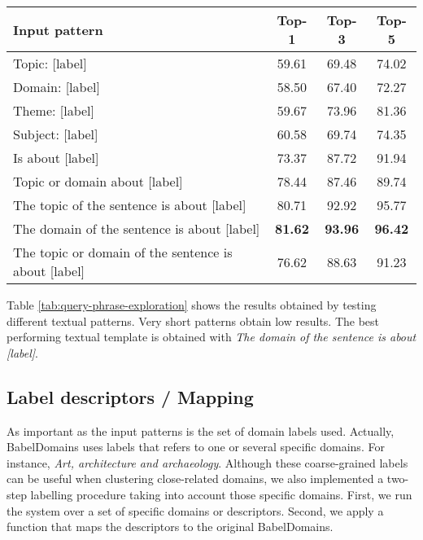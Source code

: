 \documentclass[11pt]{article}
\begin{document}
\begin{table*}[!t]
    \centering
\begin{tabularx}{0.77\linewidth}{lccc}
        \toprule
        Input pattern & Top-1 & Top-3 & Top-5 \\
        \midrule
        Topic: [label] & 59.61 & 69.48 & 74.02  \\
        Domain: [label] & 58.50 & 67.40 & 72.27 \\
        Theme: [label] & 59.67 & 73.96 & 81.36 \\
        Subject: [label] & 60.58 & 69.74 & 74.35 \\
        Is about [label] & 73.37 & 87.72 & 91.94 \\
        Topic or domain about [label] & 78.44 & 87.46 & 89.74 \\
        The topic of the sentence is about [label] & 80.71 & 92.92 & 95.77 \\
        The domain of the sentence is about [label] & \textbf{81.62} & \textbf{93.96} & \textbf{96.42} \\
        The topic or domain of the sentence is about [label] & 76.62 & 88.63 & 91.23 \\
        \bottomrule
    \end{tabularx}
\caption{Some of the explored \textit{input patterns} for the MNLI approach and their Top-1, Top-3 and Top-5 accuracy.}
    \label{tab:query-phrase-exploration}
\end{table*}

Table \ref{tab:query-phrase-exploration} shows the results obtained by testing different textual patterns. Very short patterns obtain low results. The best performing textual template is obtained with \textit{The domain of the sentence is about [label]}.

\subsection{Label descriptors / Mapping}

As important as the input patterns is the set of domain labels used. Actually, BabelDomains uses labels that refers to one or several specific domains. For instance, {\it Art, architecture and archaeology}. Although these coarse-grained labels can be useful when clustering close-related domains, we also implemented a two-step labelling procedure taking into account those specific domains. First, we run the system over a set of specific domains or descriptors. Second, we apply a function that maps the descriptors to the original BabelDomains. 
\end{document}
